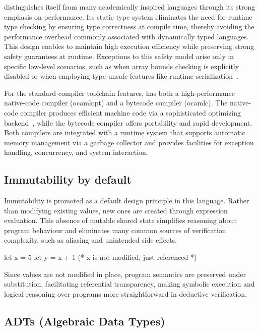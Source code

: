 \ocaml distinguishes itself from many academically inspired languages through its strong emphasis on performance. Its static 
type system eliminates the need for runtime type checking by ensuring type correctness at compile time, thereby avoiding the 
performance overhead commonly associated with dynamically typed languages. This design enables \ocaml to maintain high 
execution efficiency while preserving strong safety guarantees at runtime. Exceptions to this safety model arise only in 
specific low-level scenarios, such as when array bounds checking is explicitly disabled or when employing type-unsafe features 
like runtime serialization~\cite{FilliatrePereiraSousa2018}.

For the standard compiler toolchain features, \ocaml has both a high-performance native-code compiler (\textsf{ocamlopt}) and a 
bytecode compiler (\textsf{ocamlc}). The native-code compiler produces efficient machine code via a sophisticated optimizing 
backend~\cite{abs-1011-1783}, while the bytecode compiler offers portability and rapid development. Both compilers are integrated 
with a runtime system that supports automatic memory management via a garbage collector and provides facilities for exception handling, 
concurrency, and system interaction.

\subsection{Immutability by default}

Immutability is promoted as a default design principle in this language. Rather than modifying existing values, new ones 
are created through expression evaluation. This absence of mutable shared state simplifies reasoning about program behaviour 
and eliminates many common sources of verification complexity, such as aliasing and unintended side effects.

\begin{ocamlenv}
  let x = 5
  let y = x + 1 (* x is not modified, just referenced *)
\end{ocamlenv}

Since values are not modified in place, program semantics are preserved under substitution, facilitating referential transparency, 
making symbolic execution and logical reasoning over programs more straightforward in deductive verification.

\subsection{ADTs (Algebraic Data Types)}
\label{subsec:ADT}

